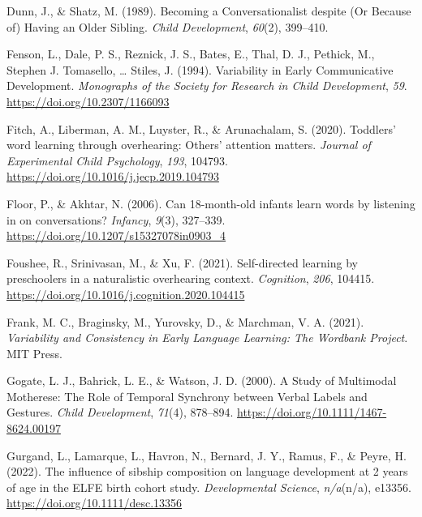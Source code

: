 \documentclass[
  man,floatsintext]{apa6}
\newlength{\cslhangindent}
\newlength{\cslentryspacingunit} %
\newenvironment{CSLReferences}[2] %
 {%
  \setlength{\parindent}{0pt}
  \ifodd #1
  \let\oldpar\par
  \def\par{\hangindent=\cslhangindent\oldpar}
  \fi
  \setlength{\parskip}{#2\cslentryspacingunit}
 }%
 {}
\begin{document}
\begin{CSLReferences}{1}{0}
\leavevmode{}%
Dunn, J., \& Shatz, M. (1989). Becoming a {Conversationalist} despite ({Or} {Because} of) {Having} an {Older} {Sibling}. \emph{Child Development}, \emph{60}(2), 399--410.

\leavevmode{}%
Fenson, L., Dale, P. S., Reznick, J. S., Bates, E., Thal, D. J., Pethick, M., Stephen J. Tomasello, \ldots{} Stiles, J. (1994). Variability in {Early} {Communicative} {Development}. \emph{Monographs of the Society for Research in Child Development}, \emph{59}. \url{https://doi.org/10.2307/1166093}

\leavevmode{}%
Fitch, A., Liberman, A. M., Luyster, R., \& Arunachalam, S. (2020). Toddlers' word learning through overhearing: {Others}' attention matters. \emph{Journal of Experimental Child Psychology}, \emph{193}, 104793. \url{https://doi.org/10.1016/j.jecp.2019.104793}

\leavevmode{}%
Floor, P., \& Akhtar, N. (2006). Can 18-month-old infants learn words by listening in on conversations? \emph{Infancy}, \emph{9}(3), 327--339. \url{https://doi.org/10.1207/s15327078in0903_4}

\leavevmode{}%
Foushee, R., Srinivasan, M., \& Xu, F. (2021). Self-directed learning by preschoolers in a naturalistic overhearing context. \emph{Cognition}, \emph{206}, 104415. \url{https://doi.org/10.1016/j.cognition.2020.104415}

\leavevmode{}%
Frank, M. C., Braginsky, M., Yurovsky, D., \& Marchman, V. A. (2021). \emph{Variability and {Consistency} in {Early} {Language} {Learning}: {The} {Wordbank} {Project}}. MIT Press.

\leavevmode{}%
Gogate, L. J., Bahrick, L. E., \& Watson, J. D. (2000). A {Study} of {Multimodal} {Motherese}: {The} {Role} of {Temporal} {Synchrony} between {Verbal} {Labels} and {Gestures}. \emph{Child Development}, \emph{71}(4), 878--894. \url{https://doi.org/10.1111/1467-8624.00197}

\leavevmode{}%
Gurgand, L., Lamarque, L., Havron, N., Bernard, J. Y., Ramus, F., \& Peyre, H. (2022). The influence of sibship composition on language development at 2 years of age in the {ELFE} birth cohort study. \emph{Developmental Science}, \emph{n/a}(n/a), e13356. \url{https://doi.org/10.1111/desc.13356}


\end{CSLReferences}
\end{document}
